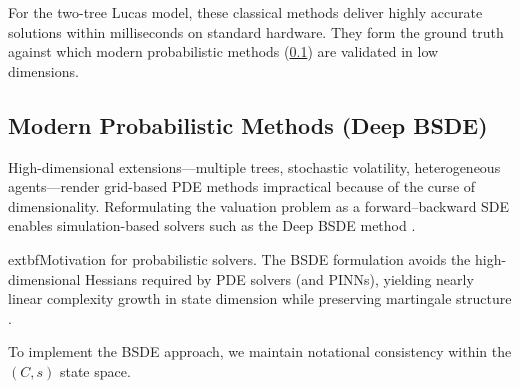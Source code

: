 ﻿\documentclass[11pt,letterpaper,oneside]{article}
\numberwithin{equation}{section}
\newcommand{\1}{\mathbf{1}}
\begin{document}
\begin{tcolorbox}[didacticstyle, title={Computational benchmark}]
For the two-tree Lucas model, these classical methods deliver highly accurate solutions within milliseconds on standard hardware. They form the ground truth against which modern probabilistic methods (\cref{sec:computation_probabilistic}) are validated in low dimensions.
\end{tcolorbox}

\subsection{Modern Probabilistic Methods (Deep BSDE)}\label{sec:computation_probabilistic}
High-dimensional extensions---multiple trees, stochastic volatility, heterogeneous agents---render grid-based PDE methods impractical because of the curse of dimensionality. Reformulating the valuation problem as a forward--backward SDE enables simulation-based solvers such as the Deep BSDE method \cite{han2018solving,huang2025probabilistic}.
\begin{tcolorbox}[literaturestyle]
  	extbf{Motivation for probabilistic solvers.} The BSDE formulation avoids the high-dimensional Hessians required by PDE solvers (and PINNs), yielding nearly linear complexity growth in state dimension while preserving martingale structure \cite{huang2025probabilistic}.
\end{tcolorbox}
To implement the BSDE approach, we maintain notational consistency within the $(C,s)$ state space.
\end{document}
